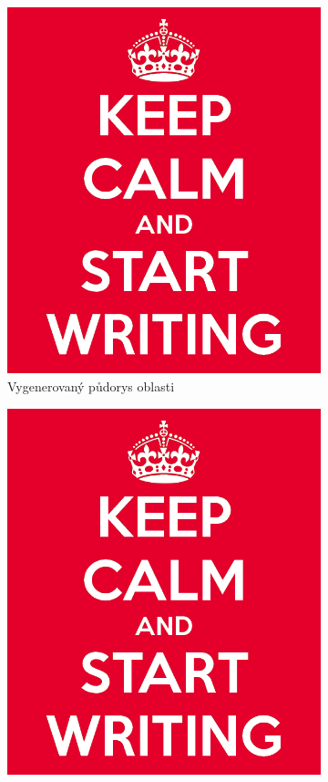 \begin{figure}[h]
	\centering
	\begin{subfigure}{0.475\textwidth}
		\centering
		\includegraphics[scale=0.3]{obrazky-figures/keep-calm.png}
		\caption{Vygenerovaný půdorys oblasti}
	\end{subfigure}
	\begin{subfigure}{0.475\textwidth}
		\centering
		\includegraphics[scale=0.3]{obrazky-figures/keep-calm.png}

\end{subfigure}
\end{figure}
